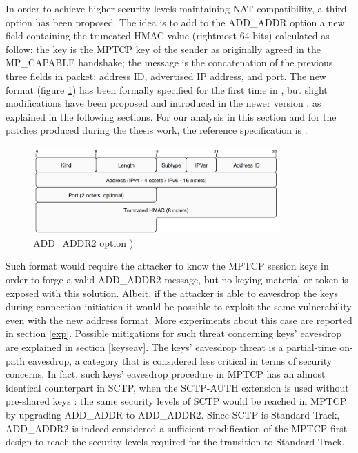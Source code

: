In order to achieve higher security levels maintaining NAT compatibility, a third option has been proposed. The idea is to add to the ADD\_ADDR option a new field containing the truncated HMAC value (rightmost 64 bits) calculated as follow: the key is the MPTCP key of the sender as originally agreed in the MP\_CAPABLE handshake; the message is the concatenation of the previous three fields in packet: address ID, advertised IP address, and port. The new format (figure \ref{fig:addaddr2}) has been formally specified for the first time in  \cite{rfc6824bis04}, but slight modifications have been proposed and introduced in the newer version  \cite{rfc6824bis05}, as explained in the following sections. For our analysis in this section and for the patches produced during the thesis work, the reference specification is .

\begin{figure}[!htb]
\centering
\includegraphics[width=0.85\textwidth]{images/addaddr2}
\caption{ADD\_ADDR2 option \cite{rfc6824bis04})}
\label{fig:addaddr2}
\end{figure}

Such format would require the attacker to know the MPTCP session keys in order to forge a valid ADD\_ADDR2 message, but no keying material or token is exposed with this solution. Albeit, if the attacker is able to eavesdrop the keys during connection initiation it would be possible to exploit the same vulnerability even with the new address format. More experiments about this case are reported in section \ref{exp}. Possible mitigations for such threat concerning keys' eavesdrop are explained in section \ref{keyseav}. The keys' eavesdrop threat is a partial-time on-path eavesdrop, a category that is considered less critical in terms of security concerns. In fact, such keys' eavesdrop procedure in MPTCP has an almost identical counterpart in SCTP, when the SCTP-AUTH extension is used without pre-shared keys \cite{rfc5061}: the same security levels of SCTP would be reached in MPTCP by upgrading ADD\_ADDR to ADD\_ADDR2. Since SCTP is Standard Track, ADD\_ADDR2 is indeed considered a sufficient modification of the MPTCP first design to reach the security levels required for the transition to Standard Track.

